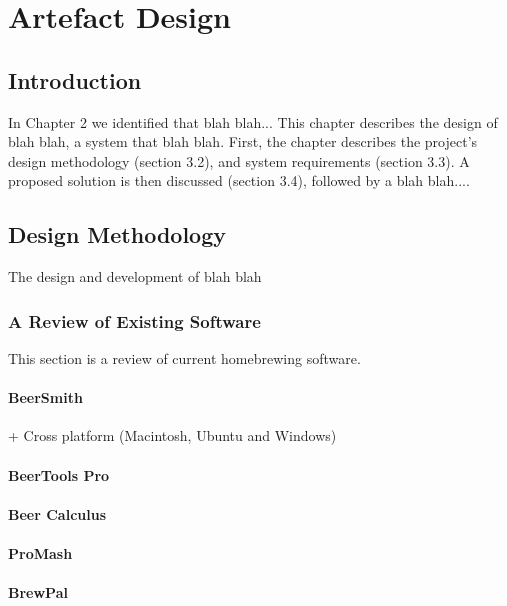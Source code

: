 \chapter{Artefact Design}

\section{Introduction} \label{a-d--introduction}

In Chapter 2 we identified that blah blah...
This chapter describes the design of blah blah, a system that blah blah.  First, the chapter describes the project’s design methodology (section 3.2), and system requirements (section 3.3).  A proposed solution is then discussed (section 3.4), followed by a blah blah....


\section{Design Methodology} \label{a-d--methodology}

The design and development of blah blah

\subsection{A Review of Existing Software} \label{a--d--review-of-existing-software}

This section is a review of current homebrewing software.

\subsubsection{BeerSmith}

+ Cross platform (Macintosh, Ubuntu and Windows)

\subsubsection{BeerTools Pro}
\subsubsection{Beer Calculus}
\subsubsection{ProMash}
\subsubsection{BrewPal}
